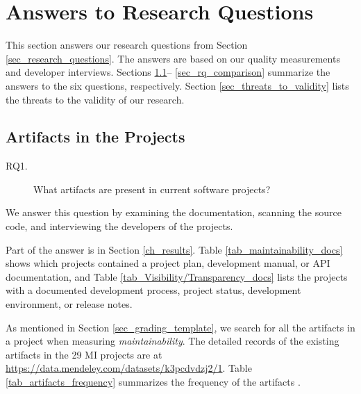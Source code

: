 \chapter{Answers to Research Questions}
\label{ch_answers}

This section answers our research questions from Section \ref{sec_research_questions}. The answers are based on our quality measurements and developer interviews. Sections \ref{sec_rq_artifacts}-- \ref{sec_rq_comparison} summarize the answers to the six questions, respectively. Section \ref{sec_threats_to_validity} lists the threats to the validity of our research.

\section{Artifacts in the Projects}
\label{sec_rq_artifacts}
\begin{description}
\item[RQ1.] What artifacts are present in current software projects?
\end{description}

We answer this question by examining the documentation, scanning the source code, and interviewing the developers of the projects.

Part of the answer is in Section \ref{ch_results}. Table \ref{tab_maintainability_docs} shows which projects contained a project plan, development manual, or API documentation, and Table \ref{tab_Visibility/Transparency_docs} lists the projects with a documented development process, project status, development environment, or release notes.

As mentioned in Section \ref{sec_grading_template}, we search for all the artifacts in a project when measuring \textit{maintainability}. The detailed records of the existing artifacts in the 29 MI projects are at \hyperlink{https://data.mendeley.com/datasets/k3pcdvdzj2/1}{https://data.mendeley.com/datasets/k3pcdvdzj2/1}. Table \ref{tab_artifacts_frequency} summarizes the frequency of the artifacts .

